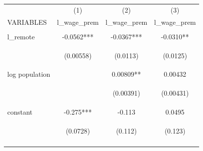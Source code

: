 \documentclass[12 pt]{article}
\begin{document}
\begin{table}
    \centering
    \begin{tabular}{lccc} \hline
     & (1) & (2) & (3) \\
    VARIABLES & l\_wage\_prem & l\_wage\_prem & l\_wage\_prem \\ \hline
    \vspace{4pt} & \begin{footnotesize}\end{footnotesize} & \begin{footnotesize}\end{footnotesize} & \begin{footnotesize}\end{footnotesize} \\
    l\_remote & -0.0562*** & -0.0367*** & -0.0310** \\
    \vspace{4pt} & \begin{footnotesize}(0.00558)\end{footnotesize} & \begin{footnotesize}(0.0113)\end{footnotesize} & \begin{footnotesize}(0.0125)\end{footnotesize} \\
    log population &  & 0.00809** & 0.00432 \\
    \vspace{4pt} & \begin{footnotesize}\end{footnotesize} & \begin{footnotesize}(0.00391)\end{footnotesize} & \begin{footnotesize}(0.00431)\end{footnotesize} \\
    constant & -0.275*** & -0.113 & 0.0495 \\
     & \begin{footnotesize}(0.0728)\end{footnotesize} & \begin{footnotesize}(0.112)\end{footnotesize} & \begin{footnotesize}(0.123)\end{footnotesize} \\
    \vspace{4pt} & \begin{footnotesize}\end{footnotesize} & \begin{footnotesize}\end{footnotesize} & \begin{footnotesize}\end{footnotesize} \\

\end{tabular}
\end{table}
\end{document}
